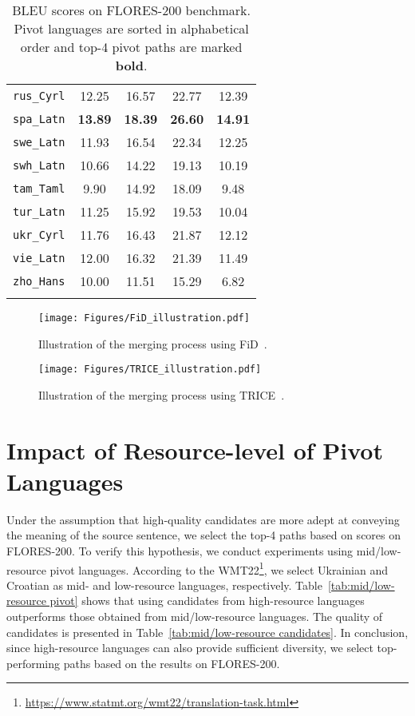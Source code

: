 \begin{table}[h]
\begin{adjustbox}{width=\columnwidth, center}
\begin{tabular}{ccccc}
\texttt{rus\_Cyrl} & 12.25 & 16.57 & 22.77 & 12.39 \\
\texttt{spa\_Latn} & \textbf{13.89} & \textbf{18.39} & \textbf{26.60} & \textbf{14.91} \\
\texttt{swe\_Latn} & 11.93 & 16.54 & 22.34 & 12.25 \\
\texttt{swh\_Latn} & 10.66 & 14.22 & 19.13 & 10.19 \\
\texttt{tam\_Taml} & 9.90 & 14.92 & 18.09 & 9.48 \\
\texttt{tur\_Latn} & 11.25 & 15.92 & 19.53 & 10.04 \\
\texttt{ukr\_Cyrl} & 11.76 & 16.43 & 21.87 & 12.12 \\
\texttt{vie\_Latn} & 12.00 & 16.32 & 21.39 & 11.49 \\
\texttt{zho\_Hans} & 10.00 & 11.51 & 15.29 & 6.82 \\

\Xhline{3\arrayrulewidth} 
\end{tabular}
\end{adjustbox}
\caption{BLEU scores on FLORES-200 benchmark. Pivot languages are sorted in alphabetical order and top-4 pivot paths are marked \textbf{bold}.}
\label{tab:pivot path}
\end{table}



\begin{figure*}[!t]
  \centering
  \texttt{[image: Figures/FiD\_illustration.pdf]} 
  \caption{Illustration of the merging process using FiD~\cite{fid}.}
  \label{fig:FiD}
\end{figure*}


\begin{figure*}[!t]
  \centering
  \texttt{[image: Figures/TRICE\_illustration.pdf]} 
  \caption{Illustration of the merging process using TRICE~\cite{trice}.}
  \label{fig:TRICE}
\end{figure*}

\section{Impact of Resource-level of Pivot Languages}
\label{apdx:resource level of pivot languages}



Under the assumption that high-quality candidates are more adept at conveying the meaning of the source sentence, we select the top-4 paths based on scores on FLORES-200.
To verify this hypothesis, we conduct experiments using mid/low-resource pivot languages.
According to the WMT22\footnote{\url{https://www.statmt.org/wmt22/translation-task.html}}, we select Ukrainian and Croatian as mid- and low-resource languages, respectively.
Table~\ref{tab:mid/low-resource pivot} shows that using candidates from high-resource languages outperforms those obtained from mid/low-resource languages. 
The quality of candidates is presented in Table~\ref{tab:mid/low-resource candidates}.
In conclusion, since high-resource languages can also provide sufficient diversity, we select top-performing paths based on the results on FLORES-200.



